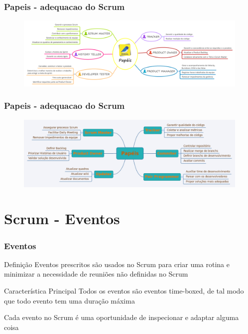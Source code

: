 \begin{frame}
 \frametitle{Papeis - adequacao do Scrum}
  \begin{figure}
   \centering
   \includegraphics[width = \textwidth]{figs/fig6.png}
  \end{figure}
\end{frame}

\begin{frame}
 \frametitle{Papeis - adequacao do Scrum}
  \begin{figure}
   \centering
   \includegraphics[width = \textwidth]{figs/Papeis2.png}
  \end{figure}
\end{frame}

\section{Scrum - Eventos}

\begin{frame}
 \frametitle{Eventos}
 \begin{block}{Definição}
 Eventos prescritos são usados no Scrum para criar uma rotina e minimizar a necessidade de
reuniões não definidas no Scrum
 \end{block}
  \begin{block}{Característica Principal}
 Todos os eventos são eventos time-boxed, de tal modo que
todo evento tem uma duração máxima
 \end{block}
   \begin{block}{}
Cada evento no Scrum é uma
oportunidade de inspecionar e adaptar alguma coisa
 \end{block}
\end{frame}

